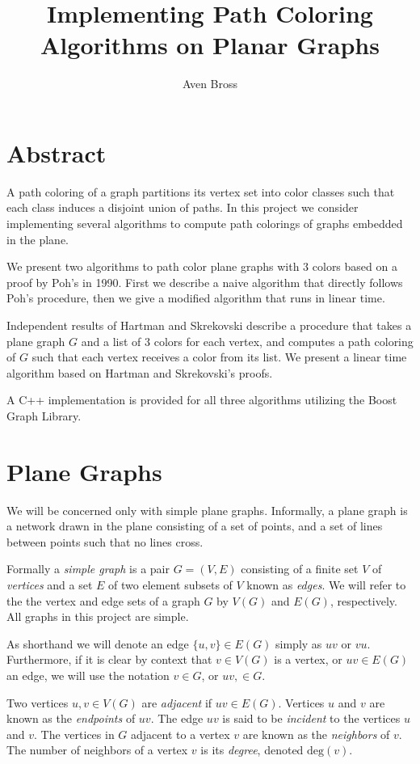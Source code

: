 \documentclass[letterpaper, 12pt]{article}
\title{Implementing Path Coloring Algorithms on Planar Graphs}
\author{Aven Bross}
\theoremstyle{definition}
\theoremstyle{definition}
\theoremstyle{thm}
\theoremstyle{definition}
\begin{document}
\maketitle

\section*{Abstract}
A path coloring of a graph partitions its vertex set into color classes such
that each class induces a disjoint union of paths. In this project we consider
implementing several algorithms to compute path colorings of graphs embedded in
the plane.

We present two algorithms to path color plane graphs with $3$ colors
based on a proof by Poh's in 1990. First we describe a naive algorithm that
directly follows Poh's procedure, then we give a modified algorithm
that runs in linear time.

Independent results of Hartman and Skrekovski describe a procedure that takes
a plane graph $G$ and a list of $3$ colors for each vertex, and
computes a path coloring of $G$ such that each vertex receives a color from its
list. We present a linear time algorithm based on Hartman and Skrekovski's
proofs.

A C++ implementation is provided for all three algorithms utilizing the Boost
Graph Library.

\section{Plane Graphs}

We will be concerned only with simple plane graphs. Informally, a plane graph
is a network drawn in the plane consisting of a set of points, and a set of
lines between points such that no lines cross.

Formally a \textit{simple graph} is a pair $G=(V,E)$ consisting of a finite set
$V$ of \textit{vertices} and a set $E$ of two element subsets of $V$ known as
\textit{edges}. We will refer to the the vertex and edge sets of a graph $G$ by
$V(G)$ and $E(G)$, respectively. All graphs in this project are simple.

As shorthand we will denote an edge $\{u,v\}\in E(G)$ simply as $uv$ or $vu$.
Furthermore, if it is clear by context that $v\in V(G)$ is a vertex, or $uv\in
E(G)$ an edge, we will use the notation $v\in G$, or $uv,\in G$.

Two vertices $u,v\in V(G)$ are \textit{adjacent} if $uv\in E(G)$. Vertices $u$
and $v$ are known as the \textit{endpoints} of $uv$. The edge $uv$ is said to be
\textit{incident} to the vertices $u$ and $v$. The vertices in $G$ adjacent to a
vertex $v$ are known as the \textit{neighbors} of $v$. The number of neighbors
of a vertex $v$ is its \textit{degree}, denoted $\text{deg}(v)$.
\end{document}
